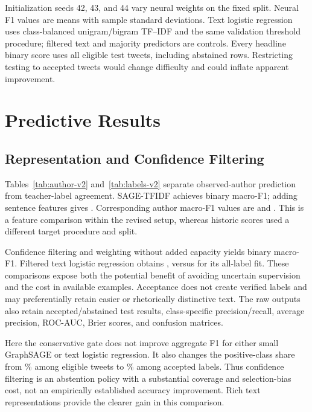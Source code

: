 \documentclass[conference]{IEEEtran}
\begin{document}
Initialization seeds 42, 43, and 44 vary neural weights on the fixed split. Neural F1 values are means with sample standard deviations. Text logistic regression uses class-balanced unigram/bigram TF--IDF and the same validation threshold procedure; filtered text and majority predictors are controls. Every headline binary score uses all eligible test tweets, including abstained rows. Restricting testing to accepted tweets would change difficulty and could inflate apparent improvement.

\section{Predictive Results}




\subsection{Representation and Confidence Filtering}
Tables~\ref{tab:author-v2} and~\ref{tab:labels-v2} separate observed-author prediction from teacher-label agreement. SAGE-TFIDF achieves \TFIDFFOne{} binary macro-F1; adding sentence features gives \SmallFOne{}. Corresponding author macro-F1 values are \TFIDFAuthorFOne{} and \SmallAuthorFOne{}. This is a feature comparison within the revised setup, whereas historic scores used a different target procedure and split.

Confidence filtering and weighting without added capacity yields \FilteredFOne{} binary macro-F1. Filtered text logistic regression obtains \FilteredTextFOne{}, versus \TextFOne{} for its all-label fit. These comparisons expose both the potential benefit of avoiding uncertain supervision and the cost in available examples. Acceptance does not create verified labels and may preferentially retain easier or rhetorically distinctive text. The raw outputs also retain accepted/abstained test results, class-specific precision/recall, average precision, ROC-AUC, Brier scores, and confusion matrices.

Here the conservative gate does not improve aggregate F1 for either small GraphSAGE or text logistic regression. It also changes the positive-class share from \EligiblePositiveRate\% among eligible tweets to \AcceptedPositiveRate\% among accepted labels. Thus confidence filtering is an abstention policy with a substantial coverage and selection-bias cost, not an empirically established accuracy improvement. Rich text representations provide the clearer gain in this comparison.
\end{document}
